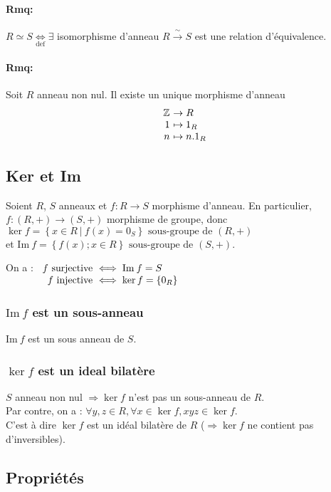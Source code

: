 \documentclass[reqno,a4paper,10pt]{report}
\newcommand{\set}[1]{\left\lbrace #1 \right\rbrace} %
\newcommand{\im}{\mathrm{Im}\:} %
\newcommand{\IZ}{\ensuremath{\mathbb{Z}}\xspace} %
\newcommand{\so}{\Rightarrow}
\newcommand{\bij}{\overset{\!\sim}{\to}} %
\newcommand{\such}{\ | \ }
\newcommand{\tdef}[1]{\underset{\text{def}}{ #1 }}
\begin{document}
\paragraph{Rmq:}
$R \simeq S \tdef{\iff} \exists$ isomorphisme d'anneau $R \bij S$
est une relation d'équivalence.

\paragraph{Rmq:}
Soit $R$ anneau non nul. Il existe un unique morphisme d'anneau
\[\begin{array}{r@{\ }l}
  \IZ &\to R\\
  1 &\mapsto 1_R\\
  n &\mapsto n.1_R
\end{array}\]


\subsection{Ker et Im}
Soient $R$, $S$ anneaux et $f: R \to S$ morphisme d'anneau. En particulier,
$f: (R,+) \to (S,+)$ morphisme de groupe, donc $\ker f = \set{x \in R
\such f(x) = 0_S} \text{ sous-groupe de } (R,+)$\\
et $\im f = \set{f(x) ; x \in R} \text{ sous-groupe de } (S,+)$.

On a : $
\begin{array}[t]{r@{\ }l}
  f \text{ surjective} &\iff \im f = S\\
  f \text{ injective} &\iff \ker f = \set{0_R}
\end{array}$

\subsubsection{$\im f$ est un sous-anneau}
$\im f$ est un sous anneau de $S$.

\subsubsection{$\ker f$ est un ideal bilatère}
$S$ anneau non nul $\so \ker f$ n'est pas un sous-anneau de $R$.\\
Par contre, on a : $\forall y,z \in R, \forall x \in \ker f, xyz \in \ker
f$.\\
C'est à dire $\ker f$ est un idéal bilatère de $R$ ($\so \ker f$ ne
contient pas d'inversibles).

\subsection{Propriétés}
\end{document}
